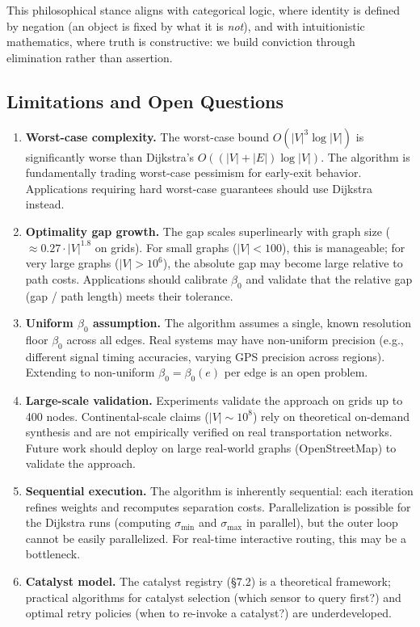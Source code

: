 \documentclass[twocolumn,11pt,a4paper]{article}
\theoremstyle{definition}
\begin{document}
This philosophical stance aligns with categorical logic, where identity is defined by negation (an object is fixed by what it is \emph{not}), and with intuitionistic mathematics, where truth is constructive: we build conviction through elimination rather than assertion.

\subsection{Limitations and Open Questions}

\begin{enumerate}

\item \textbf{Worst-case complexity.} The worst-case bound $O(|V|^3 \log |V|)$ is significantly worse than Dijkstra's $O((|V| + |E|) \log |V|)$. The algorithm is fundamentally trading worst-case pessimism for early-exit behavior. Applications requiring hard worst-case guarantees should use Dijkstra instead.

\item \textbf{Optimality gap growth.} The gap scales superlinearly with graph size ($\approx 0.27 \cdot |V|^{1.8}$ on grids). For small graphs ($|V| < 100$), this is manageable; for very large graphs ($|V| > 10^6$), the absolute gap may become large relative to path costs. Applications should calibrate $\beta_0$ and validate that the relative gap (gap / path length) meets their tolerance.

\item \textbf{Uniform $\beta_0$ assumption.} The algorithm assumes a single, known resolution floor $\beta_0$ across all edges. Real systems may have non-uniform precision (e.g., different signal timing accuracies, varying GPS precision across regions). Extending to non-uniform $\beta_0 = \beta_0(e)$ per edge is an open problem.

\item \textbf{Large-scale validation.} Experiments validate the approach on grids up to 400 nodes. Continental-scale claims ($|V| \sim 10^8$) rely on theoretical on-demand synthesis and are not empirically verified on real transportation networks. Future work should deploy on large real-world graphs (OpenStreetMap) to validate the approach.

\item \textbf{Sequential execution.} The algorithm is inherently sequential: each iteration refines weights and recomputes separation costs. Parallelization is possible for the Dijkstra runs (computing $\sigma_{\min}$ and $\sigma_{\max}$ in parallel), but the outer loop cannot be easily parallelized. For real-time interactive routing, this may be a bottleneck.

\item \textbf{Catalyst model.} The catalyst registry (§7.2) is a theoretical framework; practical algorithms for catalyst selection (which sensor to query first?) and optimal retry policies (when to re-invoke a catalyst?) are underdeveloped.

\end{enumerate}
\end{document}
